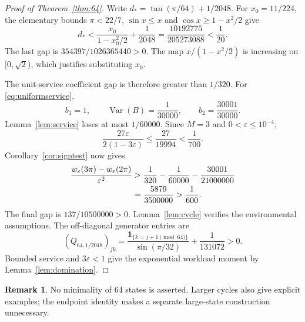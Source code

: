 \documentclass[aap,preprint]{imsart}
\numberwithin{equation}{section}
\theoremstyle{plain}
\theoremstyle{definition}
\newtheorem{remark}[theorem]{Remark}
\newcommand{\1}{\mathbf 1}
\newcommand{\eps}{\varepsilon}
\DeclareMathOperator{\Var}{Var}
\begin{document}
\begin{proof}[Proof of Theorem~\ref{thm:64}]
Write $d_* = \tan(\pi/64)+1/2048$. For $x_0=11/224$, the elementary bounds $\pi<22/7$, $\sin x\le x$ and $\cos x\ge1-x^2/2$ give
\begin{equation}\label{eq:64damping}
 d_*<\frac{x_0}{1-x_0^2/2}+\frac1{2048}
 =\frac{10192775}{205273088}<\frac1{20}.
\end{equation}
The last gap is $354397/1026365440>0$. The map $x/(1-x^2/2)$ is increasing on $[0,\sqrt2)$, which justifies substituting $x_0$.

The unit-service coefficient gap is therefore greater than $1/320$. For \eqref{eq:uniformservice},
\begin{equation}\label{eq:uniformmoments}
 b_1=1,\qquad \Var(B)=\frac1{30000},\qquad b_2=\frac{30001}{30000}.
\end{equation}
Lemma~\ref{lem:service} loses at most $1/60000$. Since $M=3$ and $0<\eps\le10^{-4}$,
\[
 \frac{27\eps}{2(1-3\eps)}\le\frac{27}{19994}<\frac1{700}.
\]
Corollary~\ref{cor:signtest} now gives
\begin{align}\label{eq:64fullmargin}
 \frac{w_\eps(3\pi)-w_\eps(2\pi)}{\eps^2}
 &>\frac1{320}-\frac1{60000}-\frac{30001}{21000000}\notag\\
 &=\frac{5879}{3500000}>\frac1{600}.
\end{align}
The final gap is $137/10500000>0$. Lemma~\ref{lem:cycle} verifies the environmental assumptions. The off-diagonal generator entries are
\[
 (Q_{64,1/2048})_{jk}
 =\frac{\1_{\{k=j+1\pmod{64}\}}}{\sin(\pi/32)}+\frac1{131072}>0.
\]
Bounded service and $3\eps<1$ give the exponential workload moment by Lemma~\ref{lem:domination}.
\end{proof}
\begin{remark}
No minimality of 64 states is asserted. Larger cycles also give explicit examples; the endpoint identity makes a separate large-state construction unnecessary.
\end{remark}
\end{document}
